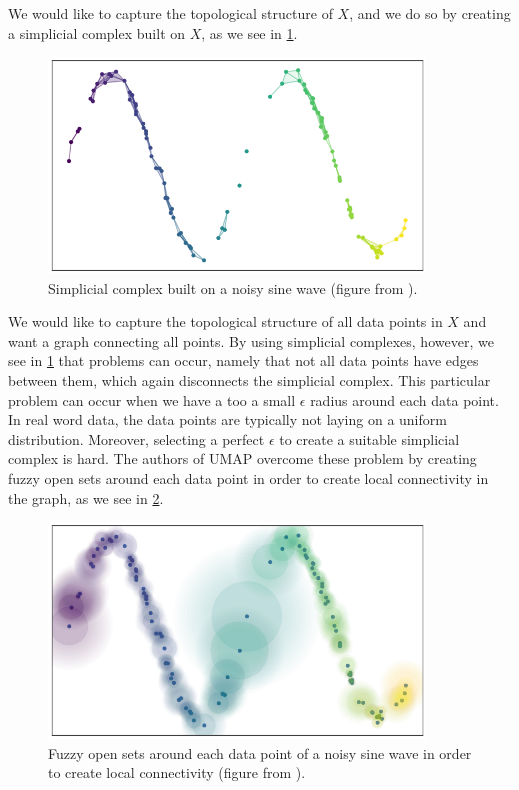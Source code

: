 We would like to capture the topological structure of $X$, and we do so by creating a simplicial complex built on $X$, as we see in \cref{fig:how_umap_works_basic_graph}.
\begin{figure}[H]
    \centering
    \includegraphics[width=10cm]{thesis/figures/how_umap_works_basic_graph.png}
    \caption{Simplicial complex built on a noisy sine wave (figure from \cite{how-umap-works-2018}).}
    \label{fig:how_umap_works_basic_graph}
\end{figure}
We would like to capture the topological structure of all data points in $X$ and want a graph connecting all points. By using simplicial complexes, however, we see in \cref{fig:how_umap_works_basic_graph} that problems can occur, namely that not all data points have edges between them, which again disconnects the simplicial complex. This particular problem can occur when we have a too a small $\epsilon$ radius around each data point. In real word data, the data points are typically not laying on a uniform distribution. Moreover, selecting a perfect $\epsilon$ to create a suitable simplicial complex is hard. The authors of UMAP overcome these problem by creating fuzzy open sets around each data point in order to create local connectivity in the graph, as we see in \cref{fig:how_umap_works_umap_open_cover}.
\begin{figure}[H]
    \centering
    \includegraphics[width=10cm]{thesis/figures/how_umap_works_umap_open_cover.png}
    \caption{Fuzzy open sets around each data point of a noisy sine wave in order to create local connectivity (figure from \cite{how-umap-works-2018}).}
    \label{fig:how_umap_works_umap_open_cover}
\end{figure}
